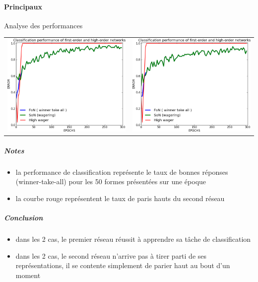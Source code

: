     \paragraph{Principaux}
      Analyse des performances
      \begin{center}
	\begin{tabular}{lr}
	  \hspace*{-1cm}
	  \includegraphics[width=250px]{data/expC3/perf_5.png}
	  &
	  \includegraphics[width=250px]{data/expC3/perf_100.png} 
	\end{tabular}
      \end{center}
      \subparagraph{Notes}
	\begin{itemize}
	  \item la performance de classification représente le taux de bonnes réponses (winner-take-all) pour les 50 formes présentées sur une époque
	  \item la courbe rouge représentent le taux de paris hauts du second réseau
	\end{itemize}
      \subparagraph{Conclusion}
	\begin{itemize}
	  \item dans les 2 cas, le premier réseau réussit à apprendre sa tâche de classification
	  \item dans les 2 cas, le second réseau n'arrive pas à tirer parti de ses représentations, 
	  il se contente simplement de parier haut au bout d'un moment
	\end{itemize}

